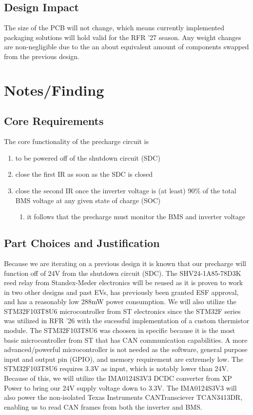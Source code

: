 \documentclass{article}
\begin{document}
\subsection{Design Impact}
The size of the PCB will not change, which means currently implemented packaging solutions will hold valid for the RFR '27 season. Any weight changes are non-negligible due to the an about equivalent amount of components swapped from the previous design.

\section{Notes/Finding}
\subsection{Core Requirements}
The core functionality of the precharge circuit is
\begin{enumerate}
	\item to be powered off of the shutdown circuit (SDC)
	\item close the first IR as soon as the SDC is closed
	\item close the second IR once the inverter voltage is (at least) 90\% of the total BMS voltage at any given state of charge (SOC)
	      \begin{enumerate}
		      \item it follows that the precharge must monitor the BMS and inverter voltage
	      \end{enumerate}
\end{enumerate}

\subsection{Part Choices and Justification}
Because we are iterating on a previous design it is known that our precharge will function off of 24V from the shutdown circuit (SDC). The SHV24-1A85-78D3K reed relay from Standex-Meder electronics will be reused as it is proven to work in two other designs and past EVs, has previously been granted ESF approval, and has a reasonably low 288mW power consumption. We will also utilize the STM32F103T8U6 microcontroller from ST electronics since the STM32F series was utilized in RFR '26 with the sucessful implementation of a custom thermistor module. The STM32F103T8U6 was choosen in specific because it is the most basic microcontroller from ST that has CAN communication capabilities. A more advanced/powerful microcontroller is not needed as the software, general purpose input and output pin (GPIO), and memory requirement are extremely low. The STM32F103T8U6 requires 3.3V as input, which is notably lower than 24V. Because of this, we will utilize the IMA0124S3V3 DCDC converter from XP Power to bring our 24V supply voltage down to 3.3V. The IMA0124S3V3 will also power the non-isolated Texas Instruments CANTransciever TCAN3413DR, enabling us to read CAN frames from both the inverter and BMS.
\end{document}
